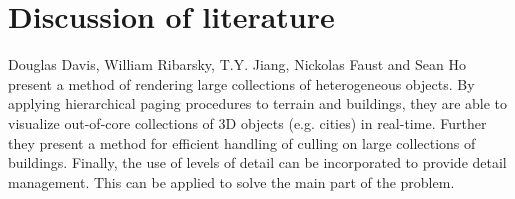 \chapter{Discussion of literature}
\label{chap:DiscussionOfLiterature}
Douglas Davis, William Ribarsky, T.Y. Jiang, Nickolas Faust and Sean Ho \cite{Davis} present a method of rendering large collections of heterogeneous objects. By applying hierarchical paging procedures to terrain and buildings, they are able to visualize out-of-core collections of 3D objects (e.g. cities) in real-time. Further they present a method for efficient handling of culling on large collections of buildings. Finally, the use of levels of detail can be incorporated to provide detail management. This can be applied to solve the main part of the problem. 